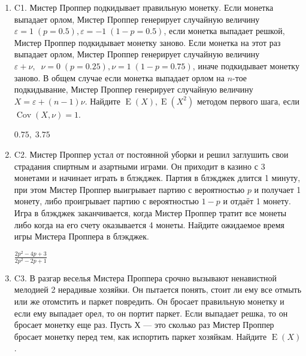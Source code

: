 \documentclass[12pt]{article}
\DeclareMathOperator{\Cov}{Cov}
\DeclareMathOperator{\E}{E}
\newenvironment{problem}{}{}
\newenvironment{sol}{}{} %
\begin{document}
\begin{enumerate}
\begin{problem}
\item[C1.] Мистер Проппер подкидывает правильную монетку. Если монетка выпадает орлом, Мистер Проппер генерирует случайную величину $\varepsilon=1\;(p=0.5), \varepsilon=-1\;(1-p=0.5)$, если монетка выпадает решкой, Мистер Проппер подкидывает монетку заново. Если монетка на этот раз выпадает орлом, Мистер Проппер генерирует случайную величину $\varepsilon+\nu,\;\; \nu=0\;(p=0.25),\nu=1\;(1-p=0.75)$, иначе подкидывает монетку заново. В общем случае если монетка выпадает орлом на $n$-тое подкидывание, Мистер Проппер генерирует случайную величину $X=\varepsilon+(n-1)\nu$. Найдите $\E(X), \E(X^2)$ методом первого шага, если $\Cov(X,\nu)=1$.

\begin{sol}
$0.75,\; 3.75$
\end{sol}
\end{problem}

\begin{problem}
\item[C2.] Мистер Проппер устал от постоянной уборки и решил заглушить свои страдания спиртным и азартными играми. Он приходит в казино с 3 монетами и начинает играть в блэкджек. Партия в блэкджек длится 1 минуту, при этом Мистер Проппер выигрывает партию с вероятностью $p$ и получает 1 монету, либо проигрывает партию с вероятностью $1-p$ и отдаёт 1 монету. Игра в блэкджек заканчивается, когда Мистер Проппер тратит все монеты либо когда на его счету оказывается 4 монеты. Найдите ожидаемое время игры Мистера Проппера  в блэкджек. 

\begin{sol}
$\frac{2p^2-4p+3}{2p^2-2p+1}$
\end{sol}
\end{problem}

\begin{problem}
\item[C3.] В разгар веселья Мистера Проппера срочно вызывают ненавистной мелодией 2 нерадивые хозяйки. Он пытается понять, стоит ли ему все отмыть или же отомстить и паркет повредить. Он бросает правильную монетку и если ему выпадает орел, то он портит паркет. Если выпадает решка, то он бросает монетку еще раз. Пусть Х — это сколько раз Мистер Проппер бросает монетку перед тем, как испортить паркет хозяйкам. Найдите $\E(X)$.


\end{problem}
\end{enumerate}
\end{document}

